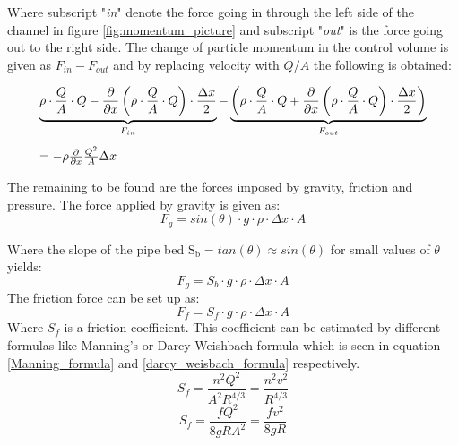 Where subscript "\textit{in}" denote the force going in through the left side of the channel in figure \ref{fig:momentum_picture} and subscript "\textit{out}" is the force going out to the right side.%
 The change of particle momentum in the control volume is given as $F_{in}- F_{out}$ and by replacing velocity with $Q/A$ the following is obtained:

\begin{equation}\label{mass_flow_speed}
\begin{array}{l}
\underbrace{\rho \cdot \frac{Q}{A} \cdot Q - \frac{\partial}{\partial x}\left(\rho \cdot \frac{Q}{A}  \cdot Q\right) \cdot \frac{\Delta x}{2}}_{F_{in}} - %
\underbrace{\left(\rho \cdot \frac{Q}{A}  \cdot Q + \frac{\partial}{\partial x}\left(\rho \cdot \frac{Q}{A}  \cdot Q\right) \cdot \frac{\Delta x}{2} \right)}_{F_{out}} \vspace{3mm}\\ 
= -  \rho\frac{\partial}{\partial x} \frac{Q^2}{A}\Delta x
\end{array}
\end{equation}

The remaining to be found are the forces imposed by gravity, friction and pressure.
The force applied by gravity is given as:
\begin{equation}
F_g = sin(\theta)\cdot g \cdot \rho \cdot \Delta x \cdot A
\label{gravity_force} 
\end{equation}

Where the slope of the pipe bed $\text{S}_\text{b} = tan(\theta) \approx sin(\theta)$ for small values of $\theta$ yields:
\begin{equation}
F_g = S_b \cdot g \cdot \rho \cdot \Delta x \cdot A 
\end{equation}
The friction force can be set up as:
\begin{equation}
F_f = S_f \cdot g \cdot \rho \cdot \Delta x \cdot A 
\label{friction_force} 
\end{equation}
Where $S_f$ is a friction coefficient. This coefficient can be estimated by different formulas like Manning's or Darcy-Weishbach formula which is seen in equation \ref{Manning_formula} and \ref{darcy_weisbach_formula} respectively. 
\begin{equation}
	S_f = \frac{n^2 Q^2}{A^2R^{4/3}}= \frac{n^2 v^2}{R^{4/3}}
\label{Manning_formula}
\end{equation}
\begin{equation}
	S_f = \frac{f Q^2}{8gR A^2}= \frac{f v^2}{8gR}
\label{darcy_weisbach_formula}
\end{equation}

